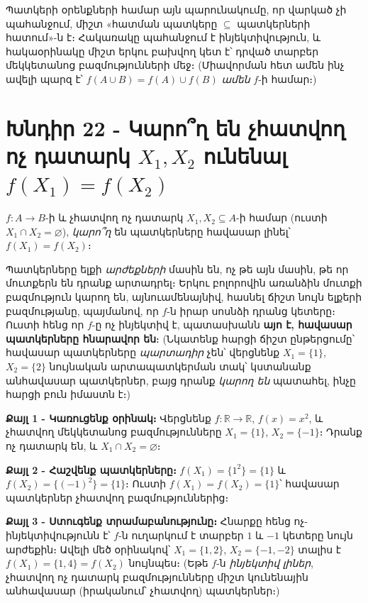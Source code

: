 \documentclass[11pt,a4paper]{article}
\newcommand{\R}{\mathbb{R}}
\begin{document}
\begin{methodbox}
Պատկերի օրենքների համար այն պարունակումը, որ վարկած չի պահանջում, միշտ
«հատման պատկերը $\subseteq$ պատկերների հատում»-ն է։ Հակառակը պահանջում է ինյեկտիվություն, և
հակաօրինակը միշտ երկու բախվող կետ է՝ դրված տարբեր մեկկետանոց բազմությունների մեջ։ (Միավորման հետ
ամեն ինչ ավելի պարզ է՝ $f(A\cup B)=f(A)\cup f(B)$ \emph{ամեն} $f$-ի համար։)
\end{methodbox}

\section*{Խնդիր 22 - Կարո՞ղ են չհատվող ոչ դատարկ $X_1,X_2$ ունենալ $f(X_1)=f(X_2)$}

\begin{problembox}[22]
$f:A\to B$-ի և չհատվող ոչ դատարկ $X_1,X_2\subseteq A$-ի համար (ուստի $X_1\cap X_2=\varnothing$),
\emph{կարո՞ղ} են պատկերները հավասար լինել՝ $f(X_1)=f(X_2)$։
\end{problembox}

\begin{ideabox}
Պատկերները ելքի \emph{արժեքների} մասին են, ոչ թե այն մասին, թե որ մուտքերն են դրանք արտադրել։ Երկու
բոլորովին առանձին մուտքի բազմություն կարող են, այնուամենայնիվ, հասնել ճիշտ նույն ելքերի
բազմությանը, պայմանով, որ $f$-ն իրար սոսնձի դրանց կետերը։ Ուստի հենց որ $f$-ը ոչ ինյեկտիվ է,
պատասխանն \textbf{այո է, հավասար պատկերները հնարավոր են}։ (Նկատենք հարցի ճիշտ ընթերցումը՝
հավասար պատկերները \emph{պարտադիր} չեն՝ վերցնենք $X_1=\{1\}$, $X_2=\{2\}$ նույնական արտապատկերման
տակ՝ կստանանք անհավասար պատկերներ, բայց դրանք \emph{կարող են} պատահել, ինչը հարցի բուն իմաստն է։)
\end{ideabox}

\textbf{Քայլ 1 - Կառուցենք օրինակ։} Վերցնենք $f:\R\to\R$, $f(x)=x^2$, և չհատվող մեկկետանոց
բազմությունները $X_1=\{1\}$, $X_2=\{-1\}$։ Դրանք ոչ դատարկ են, և $X_1\cap X_2=\varnothing$։

\textbf{Քայլ 2 - Հաշվենք պատկերները։} $f(X_1)=\{1^2\}=\{1\}$ և $f(X_2)=\{(-1)^2\}=\{1\}$։ Ուստի
$f(X_1)=f(X_2)=\{1\}$՝ հավասար պատկերներ չհատվող բազմություններից։

\textbf{Քայլ 3 - Ստուգենք տրամաբանությունը։} Հնարքը հենց ոչ-ինյեկտիվությունն է՝ $f$-ն ուղարկում է
տարբեր $1$ և $-1$ կետերը նույն արժեքին։ Ավելի մեծ օրինակով՝ $X_1=\{1,2\}$,
$X_2=\{-1,-2\}$ տալիս է $f(X_1)=\{1,4\}=f(X_2)$ նույնպես։ (Եթե $f$-ն \emph{ինյեկտիվ} \emph{լիներ},
չհատվող ոչ դատարկ բազմությունները միշտ կունենային անհավասար (իրականում՝ չհատվող) պատկերներ։)
\end{document}
